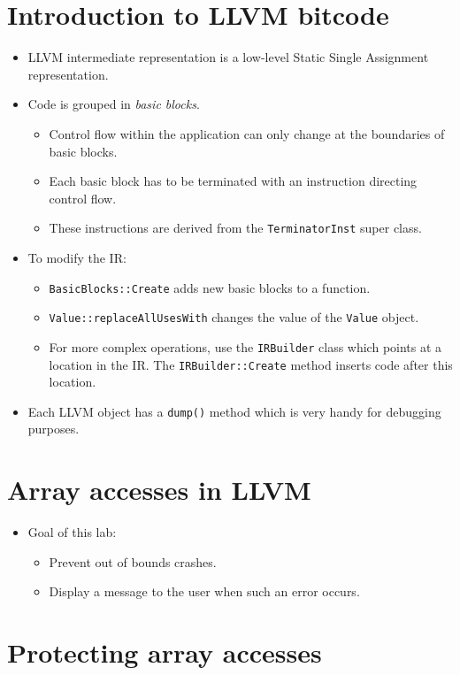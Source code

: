 \documentclass{report}
\begin{document}
\section{Introduction to LLVM bitcode}
\begin{itemize}
	\item LLVM intermediate representation is a low-level Static Single Assignment representation.
	\item Code is grouped in \textit{basic blocks}.
	\begin{itemize}
		\item Control flow within the application can only change at the boundaries of basic blocks.
		\item Each basic block has to be terminated with an instruction directing control flow.
		\item These instructions are derived from the \texttt{TerminatorInst} super class.
	\end{itemize}
	\item To modify the IR:
	\begin{itemize}
		\item \texttt{BasicBlocks::Create} adds new basic blocks to a function.
		\item \texttt{Value::replaceAllUsesWith} changes the value of the \texttt{Value} object.
		\item For more complex operations, use the \texttt{IRBuilder} class which points at a location in the IR. The \texttt{IRBuilder::Create} method inserts code after this location.
	\end{itemize}
	\item Each LLVM object has a \texttt{dump()} method which is very handy for debugging purposes.
\end{itemize}
\section{Array accesses in LLVM}
\begin{itemize}
	\item Goal of this lab:
	\begin{itemize}
		\item Prevent out of bounds crashes.
		\item Display a message to the user when such an error occurs.
	\end{itemize}
\end{itemize}
\section{Protecting array accesses}
\end{document}
